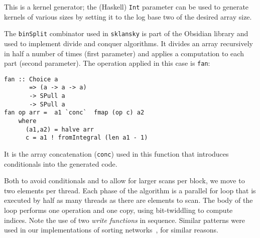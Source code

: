 This is a kernel generator;
the (Haskell) {\tt Int} parameter can be used to generate kernels of various sizes by setting 
it to the log base two of the desired array size. 

The {\tt binSplit} combinator used in {\tt sklansky} is part of the Obsidian library 
and used to implement divide and conquer algorithms. It divides an array recursively in half 
a number of times (first parameter) and applies a computation to each part (second parameter). 
The operation applied in this case is {\tt fan}: 

\begin{small}
\begin{Verbatim}[samepage=true]
fan :: Choice a
       => (a -> a -> a)
       -> SPull a
       -> SPull a
fan op arr =  a1 `conc`  fmap (op c) a2 
    where 
      (a1,a2) = halve arr
      c = a1 ! fromIntegral (len a1 - 1)
\end{Verbatim}
\end{small}

It is the array concatenation ({\tt conc}) used in this function that introduces 
conditionals into the generated code. 





Both to avoid conditionals and to allow
for larger scans per block, we move to two elements per thread.
Each phase of the algorithm is a parallel for loop that is executed 
by half as many threads as there are elements to scan. The body of the loop
performs one operation and one copy, using bit-twiddling to compute indices.
Note the use of two {\em write functions} in sequence.
Similar patterns were used in our implementations of sorting networks~, for similar reasons.


